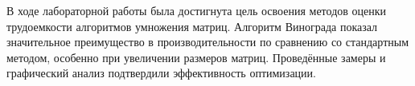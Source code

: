 
В ходе лабораторной работы была достигнута цель освоения методов оценки трудоемкости алгоритмов умножения матриц. Алгоритм Винограда показал значительное преимущество в производительности по сравнению со стандартным методом, особенно при увеличении размеров матриц. Проведённые замеры и графический анализ подтвердили эффективность оптимизации.